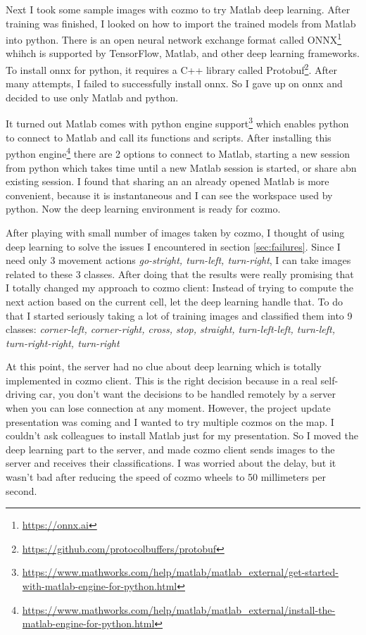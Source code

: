 \documentclass[12pt,a4paper]{article}
\begin{document}
Next I took some sample images with cozmo to try Matlab deep learning. After training was finished, I looked on how to import the trained models from Matlab into python. There is an open neural network exchange format called ONNX\footnote{\url{https://onnx.ai}} whihch is supported by TensorFlow, Matlab, and other deep learning frameworks. To install onnx for python, it requires a C++ library called Protobuf\footnote{\url{https://github.com/protocolbuffers/protobuf}}. After many attempts, I failed to successfully install onnx. So
I gave up on onnx and decided to use only Matlab and python. 

It turned out Matlab comes with python engine support\footnote{\url{https://www.mathworks.com/help/matlab/matlab_external/get-started-with-matlab-engine-for-python.html}} which enables python to connect to Matlab and call its functions and scripts. After installing this python engine\footnote{\url{https://www.mathworks.com/help/matlab/matlab_external/install-the-matlab-engine-for-python.html}} there are 2 options to connect to Matlab, starting a new session from python which takes time until a new Matlab session is started, or share abn existing session. I found that sharing an an already opened Matlab is more convenient, because it is instantaneous and I can see the workspace used by python. Now the deep learning environment is ready for cozmo.  

After playing with small number of images taken by cozmo, I thought of using deep learning to solve the issues I encountered in section \ref{sec:failures}. Since I need only 3 movement actions \textit{go-stright, turn-left, turn-right}, I can take images related to these 3 classes. After doing that the results were really promising that I totally changed my approach to cozmo client: Instead of trying to compute the next action based on the current cell, let the deep learning handle that. To do that I started seriously taking a lot of training images and classified them into 9 classes: 
\textit{corner-left,
corner-right,
cross,
stop,
straight,
turn-left-left,
turn-left,
turn-right-right,
turn-right}

At this point, the server had no clue about deep learning which is totally implemented in cozmo client. This is the right decision because in a real self-driving car, you don't want the decisions to be handled remotely by a server when you can lose connection at any moment. However, the project update presentation was coming and I wanted to try multiple cozmos on the map. I couldn't ask colleagues to install Matlab just for my presentation. So I moved the deep learning part to the server, and made cozmo client sends images to the server and receives their classifications. I was worried about the delay, but it wasn't bad after reducing the speed of cozmo wheels to 50 millimeters per second.  
 
\end{document}
